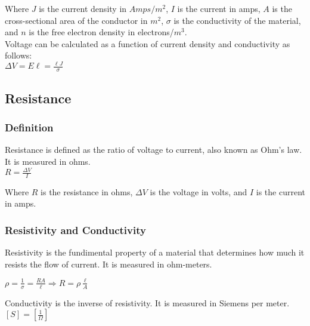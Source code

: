 Where $J$ is the current density in $Amps/m^2$, $I$ is the current in amps, $A$ is the cross-sectional 
area of the conductor in $m^2$, $\sigma$ is the conductivity of the material, and $n$ is the free electron 
density in electrons/$m^3$.\\

Voltage can be calculated as a function of current density and conductivity as follows:\\
\vbox{
    \center
    $\Delta V = E\ell = \frac{\ell J}{\sigma}$
}
\vspace{12pt}
\hrulefill

\begin{center}
\subsection*{Resistance}
\end{center}

\subsubsection*{Definition}
Resistance is defined as the ratio of voltage to current, also known as Ohm's law. It is measured in ohms.\\

\vbox{
    \center
    $R = \frac{\Delta V}{I}$
}\vspace{12pt}

Where $R$ is the resistance in ohms, $\Delta V$ is the voltage in volts, and $I$ is the current in amps.\\


\subsubsection*{Resistivity and Conductivity}

\hspace{.5cm} Resistivity is the fundimental property of a material that determines how much it resists the flow of current. 
It is measured in ohm-meters.

\vbox {
    \center
    $\rho = \frac{1}{\sigma} = \frac{RA}{\ell} \Longrightarrow R = \rho \frac{\ell}{A}$
}

\pagebreak

\hspace{.5cm} Conductivity is the inverse of resistivity. It is measured in Siemens per meter. $[S] = [\frac{1}{\Omega}]$\\

